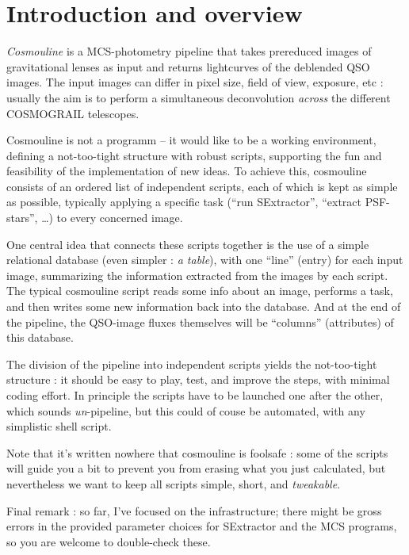 
\section{Introduction and overview}

\emph{Cosmouline} is a MCS-photometry pipeline that takes prereduced images of gravitational lenses as input and returns lightcurves of the deblended QSO images. The input images can differ in pixel size, field of view, exposure, etc : usually the aim is to perform a simultaneous deconvolution \emph{across} the different COSMOGRAIL telescopes.

Cosmouline is not a programm -- it would like to be a working environment, defining a not-too-tight structure with robust scripts, supporting the fun and feasibility of the implementation of new ideas. To achieve this, cosmouline consists of an ordered list of independent scripts, each of which is kept as simple as possible, typically applying a specific task (``run SExtractor'', ``extract PSF-stars'', \ldots) to every concerned image.

One central idea that connects these scripts together is the use of a simple relational database (even simpler : \emph{a table}), with one ``line'' (entry) for each input image, summarizing the information extracted from the images by each script. The typical cosmouline script reads some info about an image, performs a task, and then writes some new information back into the database. And at the end of the pipeline, the QSO-image fluxes themselves will be ``columns'' (attributes) of  this database.


The division of the pipeline into independent scripts yields the not-too-tight structure : it should be easy to play, test, and improve the steps, with minimal coding effort. In principle the scripts have to be launched one after the other, which sounds \emph{un}-pipeline, but this could of couse be automated, with any simplistic shell script.

Note that it's written nowhere that cosmouline is foolsafe : some of the scripts will guide you a bit to prevent you from erasing what you just calculated, but nevertheless we want to keep all scripts simple, short, and \emph{tweakable}\texttrademark.

Final remark : so far, I've focused on the infrastructure; there might be gross errors in the provided parameter choices for SExtractor and the MCS programs, so you are welcome to double-check these.



